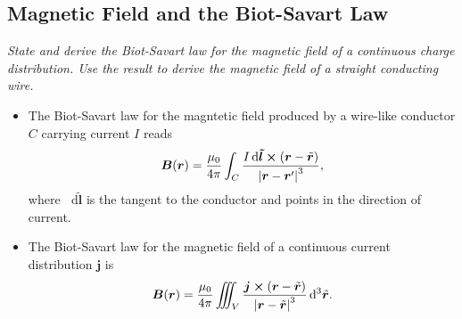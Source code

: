 \documentclass[11pt, a4paper]{article}
\newcommand{\diff}{\mathop{}\!\mathrm{d}} %
\newcommand{\dtr}{\diff^{3} \tilde{\r}}  %
\renewcommand{\vec}[1]{\bm{#1}} %
\renewcommand{\r}{\vec{r}}
\newcommand{\B}{\vec{B}} %
\newcommand{\mm}{\mu_{0}}  %
\renewcommand{\j}{\vec{j}}  %
\begin{document}
\subsection{Magnetic Field and the Biot-Savart Law}
\textit{State and derive the Biot-Savart law for the magnetic field of a continuous charge distribution. Use the result to derive the magnetic field of a straight conducting wire.}

\begin{itemize}
    \item The Biot-Savart law for the magntetic field produced by a wire-like conductor $ C $ carrying current $ I $ reads
    \begin{equation*}
        \B(\r) = \frac{\mm}{4 \pi} \int_{C} \frac{I \diff \vec{\tilde{l}} \cross (\r - \tilde{\r})}{\abs{\r - \r'}^{3}},
    \end{equation*}
    where $ \diff \vec{\tilde{l}} $ is the tangent to the conductor and points in the direction of current.
    

    \item The Biot-Savart law for the magnetic field of a continuous current distribution $ \j $ is
    \begin{equation*}
        \B(\r) = \frac{\mm}{4\pi} \iiint_{V} \frac{\j \cross (\r - \tilde{\r})}{\abs{\r - \tilde{\r}}^{3}} \dtr.
    \end{equation*}
    
    
\end{itemize}
\end{document}
